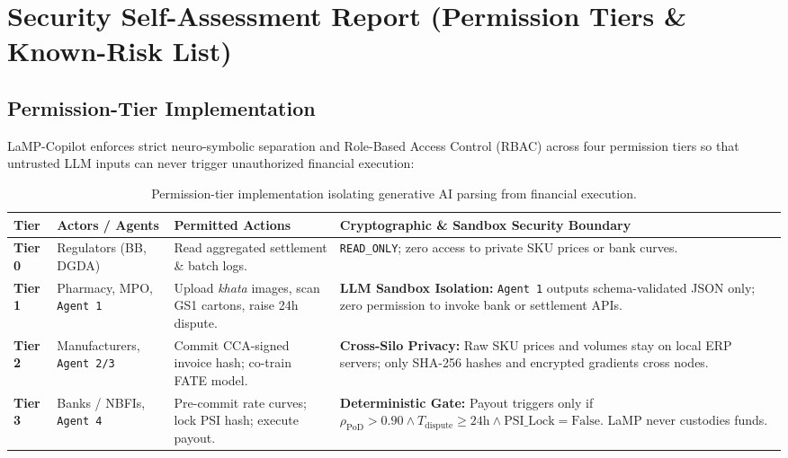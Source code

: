\documentclass[10pt,a4paper]{article}
\begin{document}
\section{Security Self-Assessment Report (Permission Tiers \& Known-Risk List)}

\subsection{Permission-Tier Implementation}
LaMP-Copilot enforces strict neuro-symbolic separation and Role-Based Access Control (RBAC) across four permission tiers so that untrusted LLM inputs can never trigger unauthorized financial execution:

\begin{table}[h!]
\centering
\footnotesize
\begin{tabularx}{\textwidth}{L{1.1cm} L{2.6cm} L{4.0cm} Y}
\toprule
\textbf{Tier} & \textbf{Actors / Agents} & \textbf{Permitted Actions} & \textbf{Cryptographic \& Sandbox Security Boundary} \\
\midrule
\textbf{Tier 0} & Regulators (BB, DGDA) & Read aggregated settlement \& batch logs. & \texttt{READ\_ONLY}; zero access to private SKU prices or bank curves. \\
\addlinespace
\textbf{Tier 1} & Pharmacy, MPO, \texttt{Agent 1} & Upload \textit{khata} images, scan GS1 cartons, raise 24h dispute. & \textbf{LLM Sandbox Isolation:} \texttt{Agent 1} outputs schema-validated JSON only; zero permission to invoke bank or settlement APIs. \\
\addlinespace
\textbf{Tier 2} & Manufacturers, \texttt{Agent 2/3} & Commit CCA-signed invoice hash; co-train FATE model. & \textbf{Cross-Silo Privacy:} Raw SKU prices and volumes stay on local ERP servers; only SHA-256 hashes and encrypted gradients cross nodes. \\
\addlinespace
\textbf{Tier 3} & Banks / NBFIs, \texttt{Agent 4} & Pre-commit rate curves; lock PSI hash; execute payout. & \textbf{Deterministic Gate:} Payout triggers only if $\rho_{\text{PoD}} > 0.90 \land T_{\text{dispute}} \ge 24\text{h} \land \text{PSI\_Lock}=\text{False}$. LaMP never custodies funds. \\
\bottomrule
\end{tabularx}
\caption{Permission-tier implementation isolating generative AI parsing from financial execution.}
\end{table}
\end{document}

